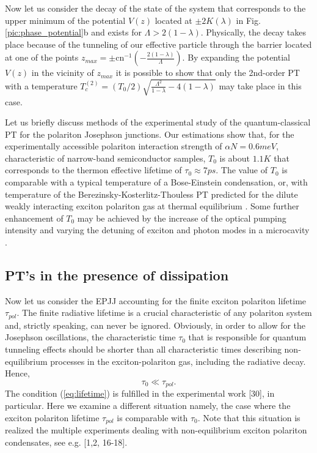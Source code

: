 \documentclass[fleqn,10pt]{wlscirep}
\newcommand{\cn}{\textrm{cn}}
\begin{document}
Now let us consider the decay of the state of the system that corresponds to the upper minimum of the potential $V(z)$ located at $\pm 2K(\lambda)$ in Fig. \ref{pic:phase_potential}b and exists for $\Lambda > 2(1 - \lambda)$.
Physically, the decay takes place because of the tunneling of our effective particle through the barrier located at one of the points $z_{max} = \pm \cn^{-1} \left( -\frac{2(1 - \lambda)}{\Lambda} \right)$.
By expanding the potential $V(z)$ in the vicinity of $z_{max}$ it is possible to show that only the 2nd-order PT with a temperature $T_{c}^{(2)} = (T_{0}/ 2) \sqrt{\frac{\Lambda^2}{1 - \lambda} - 4(1 - \lambda)}$ may take place in this case.

Let us briefly discuss methods of the experimental study of the quantum-classical PT for the polariton Josephson junctions.
Our estimations show that, for the experimentally accessible polariton interaction strength of $\alpha N=0.6meV$, characteristic of narrow-band semiconductor samples, $T_{0}$ is about $1.1K$ that corresponds to the thermon effective lifetime of $\tau_{0}\approx 7 ps$.
The value of $T_{0}$ is comparable with a typical temperature of a Bose-Einstein condensation, or, with temperature of the Berezinsky-Kosterlitz-Thouless PT predicted for the dilute weakly interacting exciton polariton gas at thermal equilibrium \cite{Sanvitto,Guillet}.
Some further enhancement of $T_{0}$ may be achieved by the increase of the optical pumping intensity and varying the detuning of exciton and photon modes in a microcavity \cite{Snoke_2017}.  

\subsection*{PT's in the presence of dissipation\label{sec:non-equilibrium}}

Now let us consider the EPJJ accounting for the finite exciton polariton lifetime $\tau_{pol}$. 
The finite radiative lifetime is a crucial characteristic of any polariton system and, strictly speaking, can never be ignored.
Obviously, in order to allow for the Josephson oscillations, the characteristic time $\tau_0$ that is responsible for quantum tunneling effects  should be shorter than all characteristic times describing non-equilibrium processes in the exciton-polariton gas, including the radiative decay. Hence,
%
\begin{equation}
\tau_{0}\ll\tau_{pol}.
\label{eq:lifetime}  
\end{equation}
%
The condition (\ref{eq:lifetime}) is fulfilled in the experimental work [30], in particular.
Here we examine a different situation namely, the case where the exciton polariton lifetime $\tau_{pol}$ is comparable with $\tau_{0}$.
Note that this situation is realized the multiple experiments dealing with non-equilibrium exciton polariton condensates, see e.g. [1,2, 16-18].  
\end{document}
